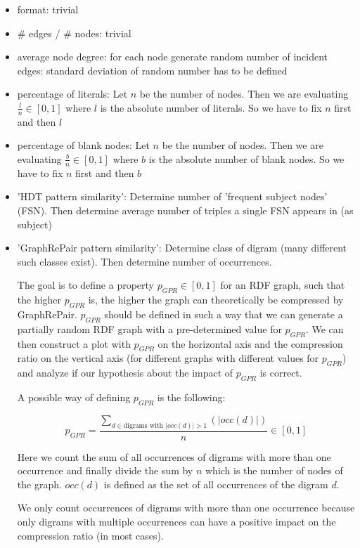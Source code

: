 \documentclass[a4paper]{scrartcl}
\begin{document}
\begin{itemize}
	\item format: trivial
	\item \# edges / \# nodes: trivial
	\item average node degree: for each node generate random number of incident edges: standard deviation of random number has to be defined
	\item percentage of literals: Let $n$ be the number of nodes. Then we are evaluating $\frac{l}{n} \in [0,1]$ where $l$ is the absolute number of literals. So we have to fix $n$ first and then $l$
	\item percentage of blank nodes: Let $n$ be the number of nodes. Then we are evaluating $ \frac{b}{n} \in [0,1]$ where $b$ is the absolute number of blank nodes. So we have to fix $n$ first and then $b$
	\item 'HDT pattern similarity': Determine number of 'frequent subject nodes' (FSN). Then determine average number of triples a single FSN appears in (as subject)
	\item 'GraphRePair pattern similarity': Determine class of digram (many different such classes exist). Then determine number of occurrences.
	
	The goal is to define a property $p_{GPR} \in [0,1]$ for an RDF graph, such that the higher  $p_{GPR}$ is, the higher the graph can theoretically be compressed by GraphRePair.  $p_{GPR}$ should be defined in such a way that we can generate a partially random RDF graph with a pre-determined value for  $p_{GPR}$. We can then construct a plot with  $p_{GPR}$ on the horizontal axis and the compression ratio on the vertical axis (for different graphs with different values for $p_{GPR}$) and analyze if our hypothesis about the impact of  $p_{GPR}$ is correct.

A possible way of defining  $p_{GPR}$ is the following:

\[
 p_{GPR}= \dfrac{\sum_{d \in \text{digrams with } |occ(d)|>1} (|occ(d)|) }{n} \in [0,1]
\]

Here we count the sum of all occurrences of digrams with more than one occurrence and finally divide the sum by $n$ which is the number of nodes of the graph. $occ(d)$ is defined as the set of all occurrences of the digram $d$.

We only count occurrences of digrams with more than one occurrence because only digrams with multiple occurrences can have a positive impact on the compression ratio (in most cases).


\end{itemize}
\end{document}

